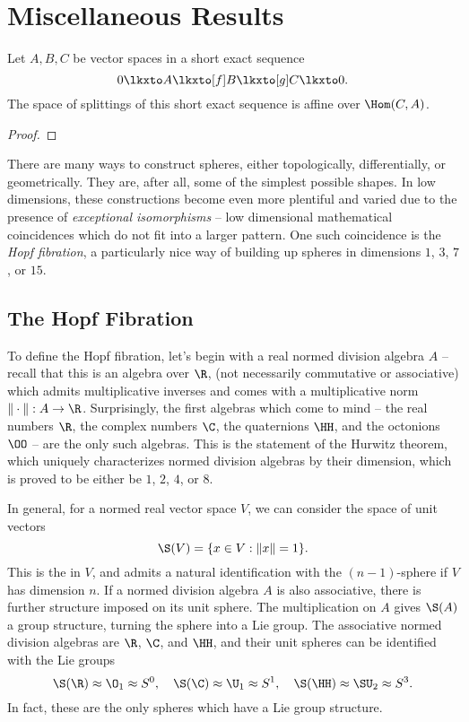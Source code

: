 \chapter{Miscellaneous Results}

\begin{proposition}\label{prop:splittings_affine}
  Let $A, B, C$ be vector spaces in a short exact sequence 
  \[
    0 \lkxto A \lkxto[f] B \lkxto[g] C\lkxto 0.
  \]
  The space of splittings of this short exact sequence is affine over $\Hom(C, A)$.
\end{proposition}
\begin{proof}
\end{proof}


There are many ways to construct spheres, either topologically, differentially, or geometrically. They are, after all, some of the simplest possible shapes. In low dimensions, these constructions become even more plentiful and varied due to the presence of \emph{exceptional isomorphisms} -- low dimensional mathematical coincidences which do not fit into a larger pattern. One such coincidence is the \emph{Hopf fibration}, a particularly nice way of building up spheres in dimensions $1$, $3$, $7$, or $15$.

\section{The Hopf Fibration}\label{sec:hopf_fibration}

To define the Hopf fibration, let's begin with a real normed division algebra $A$ -- recall that this is an algebra over $\R$, (not necessarily commutative or associative) which admits multiplicative inverses and comes with a multiplicative norm $\|\cdot\| : A \to \R$. Surprisingly, the first algebras which come to mind --
the real numbers $\R$, the complex numbers $\C$, the quaternions $\HH$, and the octonions $\OO$ -- are the only such algebras. This is the statement of the Hurwitz theorem, which uniquely characterizes normed division algebras by their dimension, which is proved to be either be $1$, $2$, $4$, or $8$.

In general, for a normed real vector space $V$, we can consider the space of unit vectors
\[
    \S(V) = \{ x\in V : \|x\| = 1\}.
\]
This is the  in $V$, and admits a natural identification with the $(n-1)$-sphere if $V$ has dimension $n$. If a normed division algebra $A$ is also associative, there is further structure imposed on its unit sphere. The multiplication on $A$ gives $\S(A)$ a group structure, turning the sphere into a Lie group. The associative normed division algebras are $\R$, $\C$, and $\HH$, and their unit spheres can be identified with the Lie groups
\[
    \S(\R)\approx \O_1\approx S^0,\quad \S(\C)\approx \U_1\approx S^1, \quad \S(\HH)\approx \SU_2\approx S^3.
\]
In fact, these are the only spheres which have a Lie group structure.


